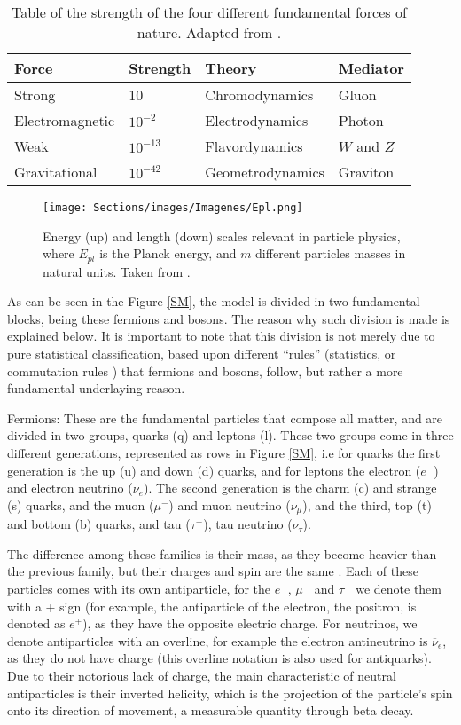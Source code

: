 \begin{table}[h!]
\centering
\caption{Table of the strength of the four different fundamental forces of nature. Adapted from \cite{Griffiths}.}
\label{forces}
\begin{tabular}{llll}
\hline
\hline
Force & Strength & Theory & Mediator \\
\hline
Strong & 10 & Chromodynamics & Gluon \\
Electromagnetic & $10^{-2}$ & Electrodynamics & Photon \\
Weak & $10^{-13}$ & Flavordynamics & $W$ and $Z$ \\
Gravitational & $10^{-42}$ & Geometrodynamics & Graviton \\
\hline
\hline
\end{tabular}
\end{table}

\begin{figure}[ht]
    \centering
    \texttt{[image: Sections/images/Imagenes/Epl.png]}
    \caption{Energy (up) and length (down) scales relevant in particle physics, where $E_{pl}$ is the Planck energy, and $m$ different particles masses in natural units. Taken from \cite{Goldberg}.}
    \label{Epl}
\end{figure}

As can be seen in the Figure \ref{SM}, the model is divided in two fundamental blocks, being these fermions and bosons. The reason why such division is made is explained below. It is important to note that this division is not merely due to pure statistical classification, based upon different ``rules'' (statistics, or commutation rules \cite{Dirac}) that fermions and bosons, follow, but rather a more fundamental underlaying reason.

Fermions: These are the fundamental particles that compose all matter, and are divided in two groups, quarks (q) and leptons (l). These two groups come in three different generations, represented as rows in Figure \ref{SM}, i.e for quarks the first generation is the up (u) and down (d) quarks, and for leptons the electron ($e^-$) and electron neutrino ($\nu_e$). The second generation is the charm (c) and strange (s) quarks, and the muon ($\mu^-$) and muon neutrino ($\nu_{\mu}$), and the third, top (t) and bottom (b) quarks, and tau ($\tau^-$), tau neutrino ($\nu_{\tau}$). 

The difference among these families is their mass, as they become heavier than the previous family, but their charges and spin are the same \cite{Langacker}. Each of these particles comes with its own antiparticle, for the $e^-$, $\mu^-$ and $\tau^-$ we denote them with a + sign (for example, the antiparticle of the electron, the positron, is denoted as $e^+$), as they have the opposite electric charge. For neutrinos, we denote antiparticles with an overline, for example the electron antineutrino is $\overline \nu_{e}$, as they do not have charge (this overline notation is also used for antiquarks). Due to their notorious lack of charge, the main characteristic of neutral antiparticles is their inverted helicity, which is the projection of the particle's spin onto its direction of movement, a measurable quantity through beta decay.

